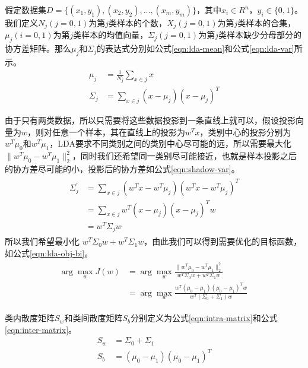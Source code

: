 假定数据集$D=\{(x_1, y_1), (x_2, y_2), ..., (x_m, y_m)\}$，其中$x_i \in R^{n}$，$y_i \in \{0, 1\}$。我们定义$N_j (j=0,1)$为第$j$类样本的个数，$X_j (j=0,1)$为第$j$类样本的合集，$\mu_j (i=0,1)$为第$j$类样本的均值向量，$\Sigma_j (j=0,1)$为第$j$类样本缺少分母部分的协方差矩阵。那么$\mu_j$和$\Sigma_j$的表达式分别如公式\ref{eqn:lda-mean}和公式\ref{eqn:lda-var}所示。
\begin{align}
\mu_j &= \frac{1}{N_j} \sum_{x\in{j}} x  \label{eqn:lda-mean}\\
\Sigma_j &= \sum_{x\in{j}} (x-\mu_{j})(x-\mu_{j})^{T} \label{eqn:lda-var}
\end{align}

由于只有两类数据，所以只需要将这些数据投影到一条直线上就可以，假设投影向量为$w$，则对任意一个样本，其在直线上的投影为$w^{T}x$，类别中心的投影分别为$w^{T}\mu_{0}$和$w^{T}\mu_{1}$，LDA要求不同类别之间的类别中心尽可能的远，所以需要最大化$\parallel w^{T}\mu_{0} - w^{T}\mu_{1} \parallel_{2}^{2}$，同时我们还希望同一类别尽可能接近，也就是样本投影之后的协方差尽可能的小，投影后的协方差如公式\ref{eqn:shadow-var}。
\begin{align}
\label{eqn:shadow-var}
\begin{split}
\Sigma_{j}^{'} &= \sum_{x\in{j}} (w^{T}x-w^{T}\mu_{j})(w^{T}x-w^{T}\mu_{j})^{T} \\
               &= \sum_{x\in{j}} w^{T}(x-\mu_{j})(x-\mu_{j})^{T}w \\
               &= w^{T}\Sigma_{j} w
\end{split}
\end{align}
所以我们希望最小化 $w^{T}\Sigma_{0} w + w^{T}\Sigma_{1} w$，由此我们可以得到需要优化的目标函数，如公式\ref{eqn:lda-obj-bi}。
\begin{align}
\label{eqn:lda-obj-bi}
\begin{split}
\arg\mathop{\max}_{w} J(w) &= \arg\mathop{\max}_{w}  \frac{\parallel w^{T}\mu_{0} - w^{T}\mu_{1} \parallel_{2}^{2}}{w^{T}\Sigma_{0} w + w^{T}\Sigma_{1} w} \\
                           &= \arg\mathop{\max}_{w}  \frac{w^{T} (\mu_{0} - \mu_{1}) (\mu_{0} - \mu_{1})^{T}w }{w^{T}(\Sigma_{0} + \Sigma_{1}) w} \
\end{split}
\end{align}

类内散度矩阵$S_w$和类间散度矩阵$S_b$分别定义为公式\ref{eqn:intra-matrix}和公式\ref{eqn:inter-matrix}。
\begin{align}
S_w &= \Sigma_{0} + \Sigma_{1} \label{eqn:intra-matrix}\\
S_b &= (\mu_{0} - \mu_{1}) (\mu_{0} - \mu_{1})^{T}  \label{eqn:inter-matrix}
\end{align}

